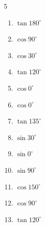 \begin{multicols}{5}
\begin{enumerate}
        \phantom{$\displaystyle =0$}

  \item $\displaystyle \tan{180^\circ}$

        \phantom{$\displaystyle =0$}

  \item $\displaystyle \cos{90^\circ}$

        \phantom{$\displaystyle =0$}

  \item $\displaystyle \cos{30^\circ}$


  \item $\displaystyle \tan{120^\circ}$


  \item $\displaystyle \cos{0^\circ}$

        \phantom{$\displaystyle =1$}

  \item $\displaystyle \cos{0^\circ}$

        \phantom{$\displaystyle =1$}

\columnbreak %

  \item $\displaystyle \tan{135^\circ}$

        \phantom{$\displaystyle =-1$}

  \item $\displaystyle \sin{30^\circ}$


  \item $\displaystyle \sin{0^\circ}$

        \phantom{$\displaystyle =0$}

  \item $\displaystyle \sin{90^\circ}$

        \phantom{$\displaystyle =1$}

  \item $\displaystyle \cos{150^\circ}$


  \item $\displaystyle \cos{90^\circ}$

        \phantom{$\displaystyle =0$}

  \item $\displaystyle \tan{120^\circ}$


\end{enumerate}
\end{multicols}
